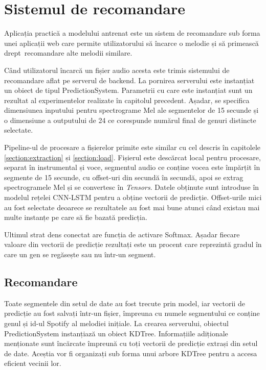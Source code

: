 \chapter{Sistemul de recomandare}
Aplicația practică a modelului antrenat este un sistem de recomandare sub forma unei aplicații web care permite utilizatorului să încarce o
melodie și să primească drept recomandare alte melodii similare.

Când utilizatorul încarcă un fișier audio acesta este trimis sistemului de recomandare aflat pe serverul de backend.
La pornirea serverului este instanțiat un obiect de tipul PredictionSystem. Parametrii cu care este instanțiat
sunt un rezultat al experimentelor realizate în capitolul precedent. Așadar, se specifica dimensiunea inputului
pentru spectrograme Mel ale segmentelor de 15 secunde și o dimensiune a outputului de 24 ce corespunde numărul
final de genuri distincte selectate.

Pipeline-ul de procesare a fișierelor primite este similar cu cel descris în capitolele
\ref{section:extraction} și \ref{section:load}. Fișierul este descărcat local pentru procesare, separat în instrumental și voce,
segmentul audio ce conține vocea este împărțit în segmente de 15 secunde, cu offset-uri
din secundă în secundă, apoi se extrag spectrogramele Mel și se convertesc în \textit{Tensors}.
Datele obținute sunt introduse în modelul rețelei CNN-LSTM pentru a obține vectorii de predicție. Offset-urile mici au fost selectate
deoarece se rezultatele au fost mai bune atunci când existau mai multe instanțe pe care să fie bazată predicția.

Ultimul strat dens conectat are funcția de activare Softmax. Așadar fiecare valoare din vectorii de
predicție rezultați este un procent care reprezintă gradul în care un gen se
regăsește sau nu într-un segment.

\section{Recomandare}

Toate segmentele din setul de date au fost trecute prin model, iar vectorii de predicție au
fost salvați într-un fișier, împreuna cu numele segmentului ce conține genul și
id-ul Spotify al melodiei inițiale. La crearea serverului, obiectul PredictionSystem
instanțiază un obiect KDTree.
Informațiile adiționale menționate sunt încărcate împreună cu toți vectorii de predicție extrași din setul de date.
Aceștia vor fi organizați sub forma unui arbore KDTree pentru a accesa eficient vecinii lor.

